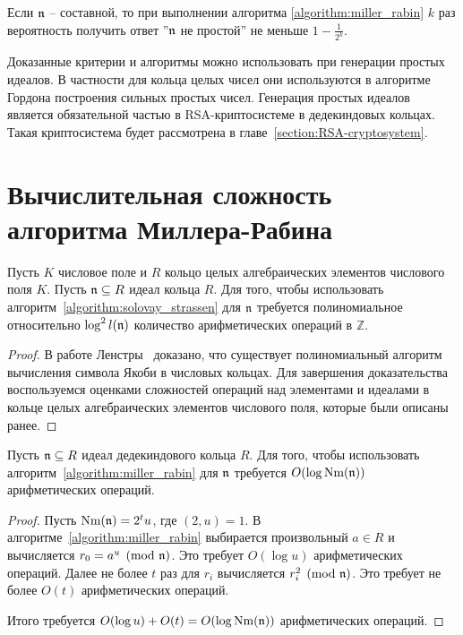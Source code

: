 \documentclass[_00_dissertation.tex]{subfiles}
\begin{document}
\begin{remark}
    Если $\mathfrak{n}$ -- составной, то при выполнении алгоритма \ref{algorithm:miller_rabin} $k$ раз вероятность получить ответ ''$\mathfrak{n}$ не простой'' не меньше $1 - \frac{1}{2^k}$.
\end{remark}

\begin{remark}
    Доказанные критерии и алгоритмы можно использовать при генерации простых идеалов.
    В частности для кольца целых чисел они используются в алгоритме Гордона построения сильных простых чисел.
    Генерация простых идеалов является обязательной частью в RSA-криптосистеме в дедекиндовых кольцах.
    Такая криптосистема будет рассмотрена в главе~\ref{section:RSA-cryptosystem}.
\end{remark}

\section{Вычислительная сложность алгоритма Миллера-Рабина}

\begin{proposition}
    Пусть $K$ числовое поле и $R$ кольцо целых алгебраических элементов числового поля $K$.
    Пусть $\mathfrak{n} \subseteq R$ идеал кольца $R$.
    Для того, чтобы использовать алгоритм~\ref{algorithm:solovay_strassen} для $\mathfrak{n}$ требуется полиномиальное относительно $\log^2 l(\mathfrak{n})$ количество арифметических операций в $\mathbb{Z}$.
\end{proposition}
\begin{proof}
    В работе Ленстры~\cite{source:Lenstra_Jacobi} доказано, что существует полиномиальный алгоритм вычисления символа Якоби в числовых кольцах.
    Для завершения доказательства воспользуемся оценками сложностей операций над элементами и идеалами в кольце целых алгебраических элементов числового поля, которые были описаны ранее.
\end{proof}

\begin{proposition}
    Пусть $\mathfrak{n} \subseteq R$ идеал дедекиндового кольца $R$.
    Для того, чтобы использовать алгоритм~\ref{algorithm:miller_rabin} для $\mathfrak{n}$ требуется $O(\log \textrm{Nm}(\mathfrak{n}))$ арифметических операций.
\end{proposition}
\begin{proof}
    Пусть $\textrm{Nm}(\mathfrak{n}) = 2^t u$, где $(2, u) = 1$.
    В алгоритме~\ref{algorithm:miller_rabin} выбирается произвольный $a \in R$ и вычисляется $r_0 = a^u \pmod{\mathfrak{n}}$.
    Это требует $O(\log u)$ арифметических операций.
    Далее не более $t$ раз для $r_i$ вычисляется $r_i^2 \pmod{\mathfrak{n}}$.
    Это требует не более $O(t)$ арифметических операций.

    Итого требуется $O(\log u) + O(t) = O(\log \textrm{Nm}(\mathfrak{n}))$ арифметических операций.
\end{proof}
\end{document}
